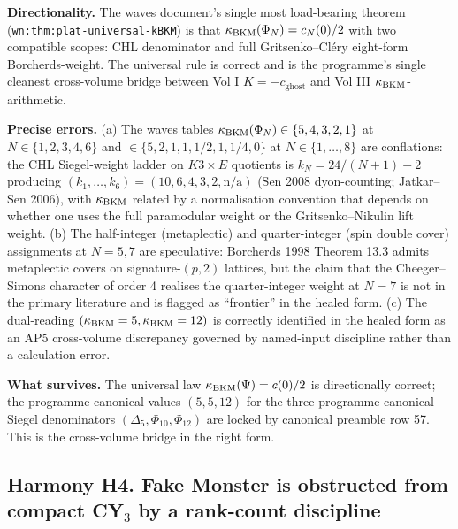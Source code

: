 \textbf{Directionality.} The waves document's single most load-bearing
theorem (\verb|wn:thm:plat-universal-kBKM|) is that
$\kappa_{\mathrm{BKM}}(\Phi_N) = c_N(0)/2$ with two compatible scopes: CHL
denominator and full Gritsenko--Cl\'ery eight-form Borcherds-weight.
The universal rule is correct and is the programme's single
cleanest cross-volume bridge between Vol I $K = -c_{\mathrm{ghost}}$
and Vol III $\kappa_{\mathrm{BKM}}$-arithmetic.

\textbf{Precise errors.} (a) The waves tables
$\kappa_{\mathrm{BKM}}(\Phi_N) \in \{5, 4, 3, 2, 1\}$ at $N \in \{1, 2, 3, 4, 6\}$ and
$\in \{5, 2, 1, 1, 1/2, 1, 1/4, 0\}$ at $N \in \{1, \ldots, 8\}$ are
conflations: the CHL Siegel-weight ladder on $K3 \times E$ quotients is
$k_N = 24/(N+1) - 2$ producing $(k_1, \ldots, k_6) = (10, 6, 4, 3, 2, \text{n/a})$
(Sen 2008 dyon-counting; Jatkar--Sen 2006), with $\kappa_{\mathrm{BKM}}$ related by a
normalisation convention that depends on whether one uses the full
paramodular weight or the Gritsenko--Nikulin lift weight. (b) The
half-integer (metaplectic) and quarter-integer (spin double cover)
assignments at $N = 5, 7$ are speculative: Borcherds 1998 Theorem 13.3
admits metaplectic covers on signature-$(p, 2)$ lattices, but the
claim that the Cheeger--Simons character of order 4 realises the
quarter-integer weight at $N = 7$ is not in the primary literature and
is flagged as ``frontier'' in the healed form. (c) The dual-reading
$(\kappa_{\mathrm{BKM}} = 5, \kappa_{\mathrm{BKM}} = 12)$ is correctly identified in the healed form as
an AP5 cross-volume discrepancy governed by named-input discipline
rather than a calculation error.

\textbf{What survives.} The universal law $\kappa_{\mathrm{BKM}}(\Psi) = c(0)/2$ is
directionally correct; the programme-canonical values
$(5, 5, 12)$ for the three programme-canonical Siegel denominators
$(\Delta_5, \Phi_{10}, \Phi_{12})$ are locked by canonical preamble
row 57. This is the cross-volume bridge in the right form.

\subsection{Harmony H4. Fake Monster is obstructed from compact CY$_3$
by a rank-count discipline}
\label{wn:subsec:H4-fake-monster-obstruction}

